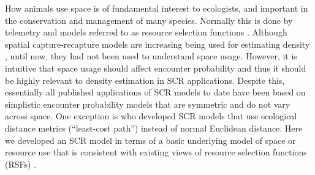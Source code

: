 \documentclass[12pt]{article}
\begin{document}
How animals use space is of 
fundamental interest to ecologists, and
important in the conservation and management of many species.
Normally this is done by telemetry and models referred to as resource
selection functions \citep{manly_etal:2002}.  
Although spatial capture-recapture models are increasing being used
for estimating density
\citep{efford:2004,borchers_efford:2008, royle:2008,
  efford_etal:2009ecol,royle_etal:2009ecol, gardner_etal:2010ecol,
  gardner_etal:2010jwm, kery_etal:2011,
  sollmann_etal:2011,mollet_etal:2012,gopalaswamy_etal:2012ecol},
until now, they had not been used to understand space usage.
However, it is intuitive that space usage should affect encounter
probability and thus it should be highly relevant to density
estimation in SCR applications. Despite this, 
essentially all published applications of SCR models to date have been
based on simplistic encounter probability models that are symmetric
and do not vary across space. One exception is
\citet{royle_etal:2012ecol} who developed SCR models that use
ecological distance metrics (``least-cost path'') instead of normal
Euclidean distance. Here we developed an SCR model in terms of a basic
underlying model of space or resource use that is consistent with
existing views of resource selection functions (RSFs)
\citep{manly_etal:2002}.
\end{document}
